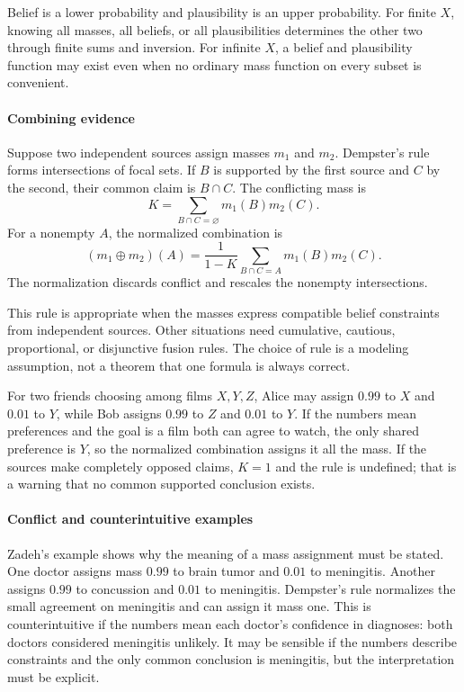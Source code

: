 Belief is a lower probability and plausibility is an upper probability. For finite $X$, knowing all masses, all beliefs, or all plausibilities determines the other two through finite sums and inversion. For infinite $X$, a belief and plausibility function may exist even when no ordinary mass function on every subset is convenient. \cite{dempster_shafer_theory_ref2,dempster_shafer_theory_ref4}

\paragraph{Combining evidence}

Suppose two independent sources assign masses $m_1$ and $m_2$. Dempster's rule forms intersections of focal sets. If $B$ is supported by the first source and $C$ by the second, their common claim is $B\cap C$. The conflicting mass is
\[
 K=\sum_{B\cap C=\varnothing}m_1(B)m_2(C).
\]
For a nonempty $A$, the normalized combination is
\[
 (m_1\oplus m_2)(A)
 =\frac{1}{1-K}
 \sum_{B\cap C=A}m_1(B)m_2(C).
\]
The normalization discards conflict and rescales the nonempty intersections.

This rule is appropriate when the masses express compatible belief constraints from independent sources. Other situations need cumulative, cautious, proportional, or disjunctive fusion rules. The choice of rule is a modeling assumption, not a theorem that one formula is always correct.

For two friends choosing among films $X,Y,Z$, Alice may assign $0.99$ to $X$ and $0.01$ to $Y$, while Bob assigns $0.99$ to $Z$ and $0.01$ to $Y$. If the numbers mean preferences and the goal is a film both can agree to watch, the only shared preference is $Y$, so the normalized combination assigns it all the mass. If the sources make completely opposed claims, $K=1$ and the rule is undefined; that is a warning that no common supported conclusion exists. \cite{dempster_shafer_theory_ref2,dempster_shafer_theory_ref5}

\paragraph{Conflict and counterintuitive examples}

Zadeh's example shows why the meaning of a mass assignment must be stated. One doctor assigns mass $0.99$ to brain tumor and $0.01$ to meningitis. Another assigns $0.99$ to concussion and $0.01$ to meningitis. Dempster's rule normalizes the small agreement on meningitis and can assign it mass one. This is counterintuitive if the numbers mean each doctor's confidence in diagnoses: both doctors considered meningitis unlikely. It may be sensible if the numbers describe constraints and the only common conclusion is meningitis, but the interpretation must be explicit.


